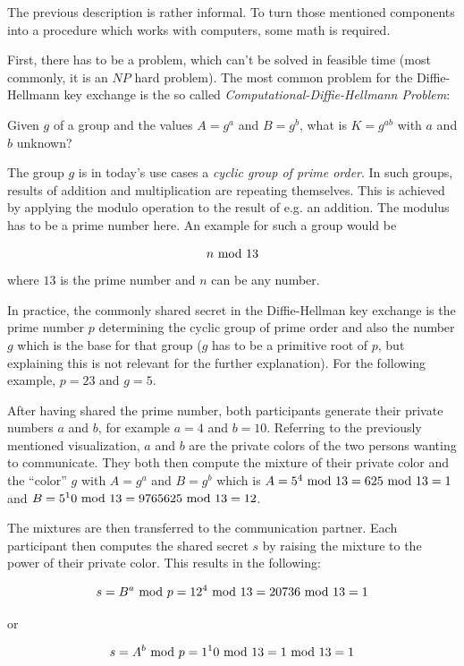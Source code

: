 The previous description is rather informal. To turn those mentioned components
into a procedure which works with computers, some math is required.

First, there has to be a problem, which can't be solved in feasible time
(most commonly, it is an $NP$ hard problem). The most common problem for
the Diffie-Hellmann key exchange is the so called
\textit{Computational-Diffie-Hellmann Problem}:

\vspace{1em}

Given $g$ of a group and the values $A = g^a$ and $B = g^b$, what is
$K = g^{ab}$ with $a$ and $b$ unknown?

\vspace{1em}

The group $g$ is in today's use cases a \textit{cyclic group of prime order}.
In such groups, results of addition and multiplication are repeating
themselves. This is achieved by applying the modulo operation to the result
of e.g. an addition. The modulus has to be a prime number here. An example
for such a group would be

$$n \ \text{mod}\ 13$$ where $13$ is the prime number and $n$ can be any number.

In practice, the commonly shared secret in the Diffie-Hellman key exchange
is the prime number $p$ determining the cyclic group of prime order and also
the number $g$ which is the base for that group ($g$ has to be a primitive
root of $p$, but explaining this is not relevant for the further explanation).
For the following example, $p = 23$ and $g = 5$.

After having shared the prime number, both participants generate their
private numbers $a$ and $b$, for example $a = 4$ and $b = 10$. Referring to the
previously mentioned visualization, $a$ and $b$ are the private colors of the
two persons wanting to communicate. They both then compute the mixture of their
private color and the ``color'' $g$ with $A = g^a$ and $B = g^b$ which is
$A = 5^4 \ \text{mod}\ 13 = 625 \ \text{mod}\ 13 = 1$ and $B = 5^10 \ \text{mod}\ 13 = 9765625 \ \text{mod}\ 13 = 12$.

The mixtures are then transferred to the communication partner. Each
participant then computes the shared secret $s$ by raising the mixture
to the power of their private color. This results in the following:

$$s = B^a \ \text{mod}\ p = 12^4 \ \text{mod}\ 13 = 20736 \ \text{mod}\ 13 = 1$$

or

$$s = A^b \ \text{mod}\ p = 1^10 \ \text{mod}\ 13 = 1 \ \text{mod}\ 13 = 1$$

